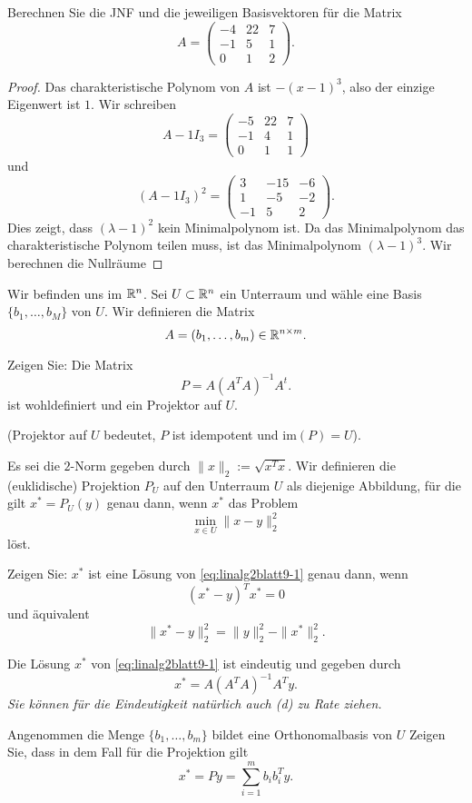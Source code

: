 \begin{Problem}
Berechnen Sie die JNF und die jeweiligen Basisvektoren für die Matrix	
\[
	A=\begin{pmatrix} -4 & 22 & 7 \\ -1 & 5 & 1 \\ 0 & 1 & 2 \end{pmatrix} 
.\] 
\end{Problem}
\begin{proof}
	Das charakteristische Polynom von $A$ ist $-(x-1)^3$, also der einzige Eigenwert ist $1$. Wir schreiben
	\[
		A-1I_3=\begin{pmatrix} -5 & 22 & 7 \\ -1 & 4 & 1 \\ 0 & 1 & 1 \end{pmatrix} 
	\]
	und
	\[
		(A-1I_3)^2=\begin{pmatrix} 3 & -15 & -6 \\ 1 & -5 & -2 \\ -1 & 5 & 2 \end{pmatrix} 
	.\] 
	Dies zeigt, dass $(\lambda-1)^2$ kein Minimalpolynom ist. Da das Minimalpolynom das charakteristische Polynom teilen muss, ist das Minimalpolynom $(\lambda-1)^3$. Wir berechnen die Nullräume
\end{proof}
\begin{Problem}
	Wir befinden uns im $\mathbb{R}^n$. Sei $U\subset \mathbb{R}^n$ ein Unterraum und w\"{a}hle eine Basis $\{b_1,\dots, b_M\} $ von $U$. Wir definieren die Matrix
	\[
		A=(b_1,\dots, b_m)\in \mathbb{R}^{n\times m}
	.\] 
	\begin{parts}
		\item Zeigen Sie: Die Matrix
			\[
				P=A(A^TA)^{-1}A^t
			.\] 
			ist wohldefiniert und ein Projektor auf $U$.

			(Projektor auf $U$ bedeutet, $P$ ist idempotent und $\text{im}(P)=U$).

			Es sei die $2$-Norm gegeben durch $\|x\|_2:=\sqrt{x^Tx} $. Wir definieren die (euklidische) Projektion $P_U$ auf den Unterraum $U$ als diejenige Abbildung, f\"{u}r die gilt $x^*=P_U(y)$ genau dann, wenn $x^*$ das Problem
			\begin{equation}\label{eq:linalg2blatt9-1}
				\min_{x\in U}\|x-y\|_2^2
			\end{equation}
			löst.
		\item Zeigen Sie: $x^*$ ist eine Lösung von \eqref{eq:linalg2blatt9-1} genau dann, wenn
			\[
				(x^*-y)^Tx^*=0\] und äquivalent
				\[
				\|x^*-y\|_2^2=\|y\|_2^2-\|x^*\|_2^2
				.\] 
			\item Die Lösung $x^*$ von \eqref{eq:linalg2blatt9-1} ist eindeutig und gegeben durch
				\[
					x^*=A(A^TA)^{-1}A^Ty
				.\] 
				{\footnotesize \emph{Sie können für die Eindeutigkeit natürlich auch (d) zu Rate ziehen.} }
			\item Angenommen die Menge $\{b_1,\dots, b_m\} $ bildet eine Orthonomalbasis von $U$ Zeigen Sie, dass in dem Fall f\"{u}r die Projektion gilt
				\[
					x^*=Py=\sum_{i=1}^m b_i b_i^Ty
				.\] 
	\end{parts}
\end{Problem}
